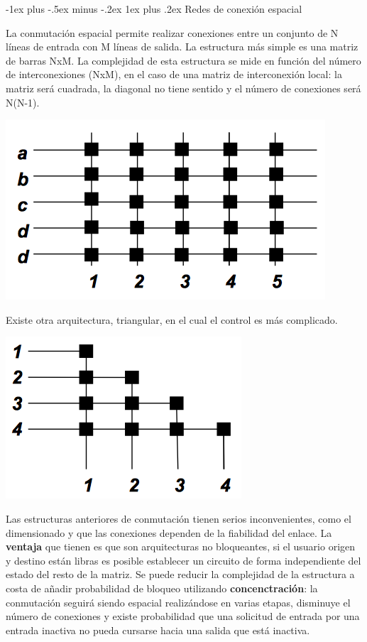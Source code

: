 \documentclass[10pt,portrait, twocolumn]{article}
\makeatletter
\renewcommand{\subsubsection}{\@startsection{subsubsection}{3}{0mm}%
                                {-1ex plus -.5ex minus -.2ex}%
                                {1ex plus .2ex}%
                                {\normalfont\small\bfseries}}
\makeatother
\begin{document}
\subsubsection{Redes de conexión espacial}

La conmutación espacial permite realizar conexiones entre un conjunto de N líneas de entrada con M líneas de salida. La estructura más simple es una matriz de barras NxM. La complejidad de esta estructura se mide en función del número de interconexiones (NxM), en el caso de una matriz de interconexión local: la matriz será cuadrada, la diagonal no tiene sentido y el número de conexiones será N(N-1).

	\begin{center}
		\includegraphics[scale = 0.3]{barras}
	\end{center}
	
Existe otra arquitectura, triangular, en el cual el control es más complicado.

	\begin{center}
		\includegraphics[scale = 0.3]{triangular}
	\end{center}
	
Las estructuras anteriores de conmutación tienen serios inconvenientes, como el dimensionado y que las conexiones dependen de la fiabilidad del enlace. La \textbf{ventaja} que tienen es que son arquitecturas no bloqueantes, si el usuario origen y destino están libras es posible establecer un circuito de forma independiente del estado del resto de la matriz. Se puede reducir la complejidad de la estructura a costa de añadir probabilidad de bloqueo utilizando \textbf{concenctración}: la conmutación seguirá siendo espacial realizándose en varias etapas, disminuye el número de conexiones y existe probabilidad que una solicitud de entrada por una entrada inactiva no pueda cursarse hacia una salida que está inactiva.
\end{document}
